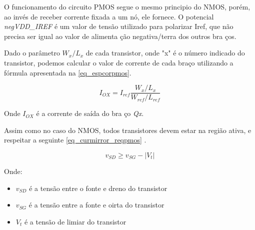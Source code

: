 O funcionamento do circuito PMOS segue o mesmo principio do NMOS, porém, ao inv\'es de receber corrente fixada a um n\'o, ele fornece. O potencial \emph{negVDD\_{IREF}} \'e um valor de tensão utilizado para polarizar Iref, que não precisa ser igual ao valor de alimenta ção negativa/terra dos outros bra ços.

Dado o parâmetro $W_x/L_x$ de cada transistor, onde "x" é o número indicado do transistor, podemos calcular o valor de corrente de cada braço utilizando a fórmula apresentada na \autoref{eq_espcorpmos}.

\begin{equation}
    \label{eq_espcorpmos}
    I_{OX} = I_{ref}\frac{W_x/L_x}{W_{ref}/L_{ref}}
\end{equation}

Onde $I_{OX}$ \'e a corrente de sa\'ida do bra ço \emph{Qx}. 

Assim como no caso do NMOS, todos transistores devem estar na região ativa, e respeitar a seguinte \autoref{eq_curmirror_reqpmos} \cite{RazaviFundM}.

\begin{equation}
    \label{eq_curmirror_reqpmos}
    v_{SD} \geq v_{SG} - |V_t|
\end{equation}

Onde:

\begin{itemize}
    \item $v_{SD}$ \'e a tensão entre o fonte e dreno do transistor
    \item $v_{SG}$ \'e a tensão entre a fonte e oirta do transistor
    \item $V_{t}$ \'e a tensão de limiar do transistor
\end{itemize}

